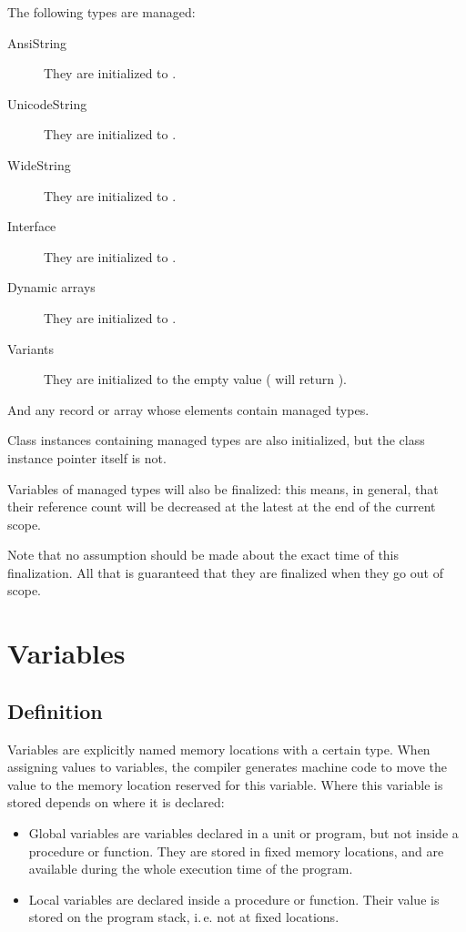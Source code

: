 The following types are managed:
\begin{description}
\item[AnsiString] They are initialized  to .
\item[UnicodeString] They are initialized  to .
\item[WideString] They are initialized  to .
\item[Interface] They are initialized  to .
\item[Dynamic arrays] They are initialized  to .
\item[Variants] They are initialized to the empty value (
will return ).
\end{description}
And any record or array whose elements contain managed types.

Class instances containing managed types are also initialized, but the class
instance pointer itself is not.

Variables of managed types will also be finalized: this means, in general, that their
reference count will be decreased at the latest at the end of the current scope.

\begin{remark}
Note that no assumption should be made about the exact time of this
finalization. All that is guaranteed that they are finalized when they go
out of scope.
\end{remark}

\chapter{Variables}
\label{ch:Variables}
\section{Definition}
Variables are explicitly named memory locations with a certain type. When
assigning values to variables, the \fpc compiler generates machine code
to move the value to the memory location reserved for this variable. Where
this variable is stored depends on where it is declared:

\begin{itemize}
\item Global variables are variables declared in a unit or program, but not
inside a procedure or function. They are stored in fixed memory locations,
and are available during the whole execution time of the program.
\item Local variables are declared inside a procedure or function. Their
value is stored on the program stack, i.\,e. not at fixed locations.
\end{itemize}

